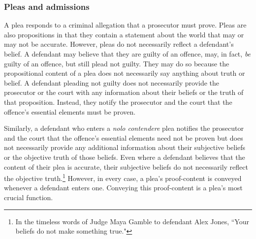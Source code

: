 \subsubsection{Pleas and admissions}

A plea responds to a criminal allegation that a prosecutor must prove. Pleas are also propositions in that they contain a statement about the world that may or may not be accurate. However, pleas do not necessarily reflect a defendant's belief. A defendant may believe that they are guilty of an offence, may, in fact, \textit{be} guilty of an offence, but still plead not guilty. They may do so because the propositional content of a plea does not necessarily say anything about truth or belief. A defendant pleading not guilty does not necessarily provide the prosecutor or the court with any information about their beliefs or the truth of that proposition. Instead, they notify the prosecutor and the court that the offence's essential elements must be proven.

Similarly, a defendant who enters a \textit{nolo contendere} plea notifies the prosecutor and the court that the offence's essential elements need not be proven but does not necessarily provide any additional information about their subjective beliefs or the objective truth of those beliefs. Even where a defendant believes that the content of their plea is accurate, their subjective beliefs do not necessarily reflect the objective truth.\footnote{In the timeless words of Judge Maya Gamble to defendant Alex Jones, ``Your beliefs do not make something true."} However, in every case, a plea's proof-content is conveyed whenever a defendant enters one. Conveying this proof-content is a plea's most crucial function.

